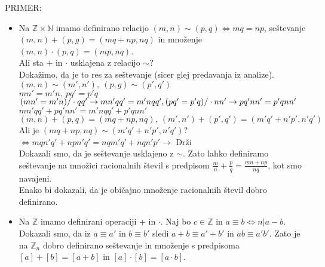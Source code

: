 \documentclass[a4paper,12pt]{article}
\begin{document}
PRIMER:
\begin{itemize}
\item Na $\mathbb{Z}\times \mathbb{N}$ imamo definirano relacijo $(m,n)\sim(p,q)\Leftrightarrow mq=np$, seštevanje $(m,n)+(p,g)=(mq+np,nq)$ in množenje $(m,n)\cdot (p,q)=(mp,nq)$. \\

Ali sta $+$ in $\cdot$ usklajena z relacijo $\sim$?\\

Dokažimo, da je to res za seštevanje (sicer glej predavanja iz analize). \\

$(m,n)\sim(m',n'),~(p,g)\sim (p',q')$ \\

$mn'=m'n,~ pq'=p'q$ \\

$(mn'=m'n)/\cdot qq' \rightarrow mn'qq'=m'nqq', \\
(pq'=p'q)/\cdot nn' \rightarrow pq'nn'=p'qnn'$ \\

$mn'qq'+pq'nn'=m'nqq'+p'qnn'$ \\

$(m,n)+(p,q)=(mq+np,nq),~(m',n')+(p',q')=(m'q'+n'p',n'q')$ \\

Ali je $(mq+np,nq)\sim (m'q'+n'p',n'q')$?\\

$\Leftrightarrow mqn'q'+npn'q'=nqm'q'+nqn'p' \rightarrow$ Drži \\

Dokazali smo, da je seštevanje usklajeno z $\sim$. Zato lahko definiramo seštevanje na množici racionalnih števil s predpisom $\frac{m}{n}+\frac{p}{q}=\frac{mn+np}{nq}$, kot smo navajeni. \\

Enako bi dokazali, da je običajno množenje racionalnih števil dobro definirano. \\

\item Na $\mathbb{Z}$ imamo definirani operaciji $+$ in $\cdot$. Naj bo $c\in \mathbb{Z}$ in $a\equiv b \Leftrightarrow n | a-b$. \\

Dokazali smo, da iz $a\equiv a'$ in $b\equiv b'$ sledi $a+b\equiv a'+b'$ in $ab\equiv a'b'$. Zato je na $\mathbb{Z}_n$ dobro definirano seštevanje in množenje s predpisoma $[a]+[b]=[a+b]$ in $[a]\cdot [b]=[a\cdot b]$. 
\end{itemize}
\end{document}

